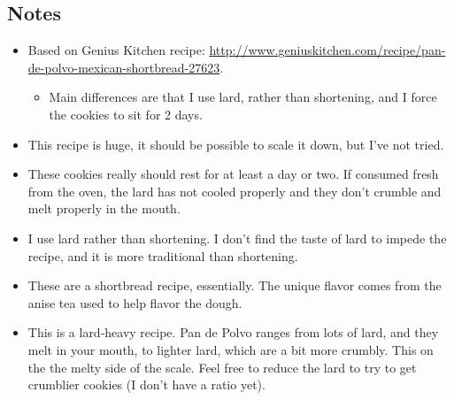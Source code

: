 \begin{multicols}{2}
\subsection*{Notes}
\begin{itemize}
    \item Based on Genius Kitchen recipe: \url{http://www.geniuskitchen.com/recipe/pan-de-polvo-mexican-shortbread-27623}.
    \begin{itemize}
        \item Main differences are that I use lard, rather than shortening, and I force the cookies to sit for 2 days.
    \end{itemize}
    \item This recipe is huge, it should be possible to scale it down, but I've not tried.
    \item These cookies really should rest for at least a day or two. If consumed fresh from the oven, the lard has not cooled properly and they don't crumble and melt properly in the mouth.
    \item I use lard rather than shortening. I don't find the taste of lard to impede the recipe, and it is more traditional than shortening.
    \item These are a shortbread recipe, essentially. The unique flavor comes from the anise tea used to help flavor the dough.
    \item This is a lard-heavy recipe. Pan de Polvo ranges from lots of lard, and they melt in your mouth, to lighter lard, which are a bit more crumbly. This on the the melty side of the scale. Feel free to reduce the lard to try to get crumblier cookies (I don't have a ratio yet).
\end{itemize}
\end{multicols}
\clearpage